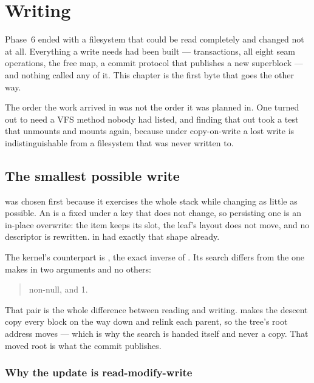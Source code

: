 \chapter{Writing}
\label{ch:writes}

Phase~6 ended with a filesystem that could be read completely and changed not at
all. Everything a write needs had been built --- transactions, all eight seam
operations, the free map, a commit protocol that publishes a new superblock ---
and nothing called any of it. This chapter is the first byte that goes the other
way.

The order the work arrived in was not the order it was planned in. One
 turned out to need a VFS method nobody had listed, and finding that
out took a test that unmounts and mounts again, because under copy-on-write a
lost write is indistinguishable from a filesystem that was never written to.

\section{The smallest possible write}

 was chosen first because it exercises the whole stack
while changing as little as possible. An  is a fixed
 under a key that does not change, so persisting one is an in-place
overwrite: the item keeps its slot, the leaf's layout does not move, and no
descriptor is rewritten.  in  had
exactly that shape already.

The kernel's counterpart is , the exact
inverse of . Its search differs from the one  makes
in two arguments and no others:

\begin{quote}
 non-null, and  1.
\end{quote}

That pair is the whole difference between reading and writing.  makes
the descent copy every block on the way down and relink each parent, so the
tree's root address moves --- which is why the search is handed
 itself and never a copy. That moved root is what the
commit publishes.

\subsection{Why the update is read-modify-write}

